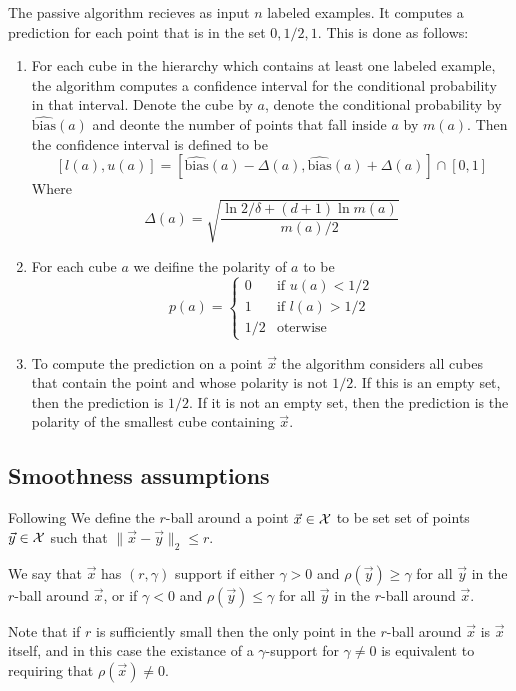 \documentclass{article}
\newcommand{\X}{{\cal X}}
\newcommand{\x}{\vec{x}}
\newcommand{\y}{\vec{y}}
\newcommand{\polarity}{p}
\newcommand{\empbias}{\widehat{\text{bias}}}
\begin{document}
The passive algorithm recieves as input $n$ labeled examples. It
computes a prediction for each point that is in the set
$0,1/2,1$. This is done as follows:
\begin{enumerate}
\item For each cube in the hierarchy which contains at least one
  labeled example, the algorithm computes a confidence interval for
  the conditional probability in that interval. Denote the cube by
  $a$, denote the conditional probability by $\empbias(a)$ and deonte
  the number of points that fall inside $a$ by $m(a)$. Then the
  confidence interval is defined to be 
  \[
    [l(a),u(a)] = \left[ \empbias(a)-\Delta(a), \empbias(a) + \Delta(a) \right]
    \cap [0,1]
  \]
  Where
  \[
    \Delta(a) = \sqrt{\frac{\ln 2/\delta+(d+1) \ln m(a)}{m(a)/2}}
    \]
\item For each cube $a$ we deifine the polarity of $a$ to be
  \[
  \polarity(a) =
  \begin{cases}
    0   & \text{if } u(a)<1/2\\
    1   & \text{if } l(a)>1/2\\
    1/2 & \text{oterwise}
  \end{cases}
  \]
\item To compute the prediction on a point $\x$ the algorithm
  considers all cubes that contain the point and whose polarity is not
  $1/2$. If this is an empty set, then the prediction is $1/2$. If it
  is not an empty set, then the prediction is the polarity of the
  smallest cube containing $\x$.
          

\end{enumerate}




\subsection{Smoothness assumptions}

Following 
We define the $r$-ball around a point $\x \in \X$ to be set set of points
$\y \in \X$ such that $\|\x -\y \|_2 \leq r$.

We say that $\x$ has $(r,\gamma)$ support if either $\gamma>0$ and
$\rho(\y)  \geq \gamma$ for all $\y$ in the $r$-ball around $\x$, or if
$\gamma<0$ and  $\rho(\y) \leq \gamma$ for all $\y$ in the $r$-ball around $\x$.

Note that if $r$ is sufficiently small then the only point in the
$r$-ball around $\x$ is $\x$ itself, and in this case the existance of
a $\gamma$-support for $\gamma \neq 0$ is equivalent to requiring that
$\rho(\x)\neq 0$.
\end{document}
